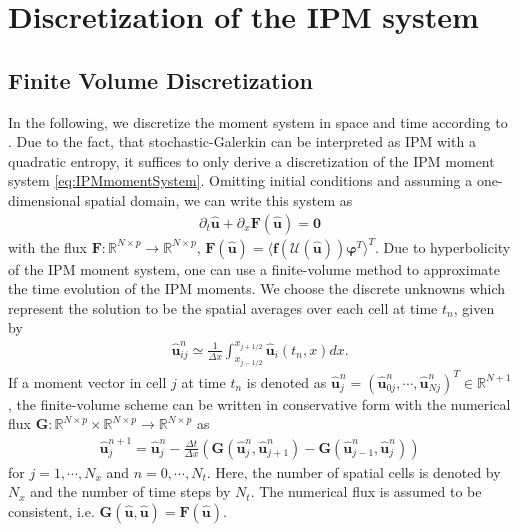 \section{Discretization of the IPM system}
\label{sec:framework}
\subsection{Finite Volume Discretization}
In the following, we discretize the moment system in space and time according to \cite{kusch2017maximum}. Due to the fact, that stochastic-Galerkin can be interpreted as IPM with a quadratic entropy, it suffices to only derive a discretization of the IPM moment system \eqref{eq:IPMmomentSystem}.  
Omitting initial conditions and assuming a one-dimensional spatial domain, we can write this system  as
\begin{align*}
\partial_t \bm{\hat u}+\partial_x \bm{F}(\bm{\hat u}) = \bm{0}
\end{align*}
with the flux $\bm{F}:\mathbb{R}^{N\times p}\to\mathbb{R}^{N\times p}$, $\bm{F}(\bm{\hat u})=\langle \bm f(\mathcal{U}(\bm{\hat u}))\bm{\varphi}^T \rangle^T$. Due to hyperbolicity of the IPM moment system, one can use a finite-volume method to approximate the time evolution of the IPM moments. We choose the discrete unknowns which represent the solution to be the spatial averages over each cell at time $t_n$, given by
\begin{align*}
\bm{\hat u}_{ij}^n \simeq \frac{1}{\Delta x}\int_{x_{j-1/ 2}}^{x_{j+1/ 2}}\bm{\hat u}_i(t_n,x) dx.
\end{align*}
If a moment vector in cell $j$ at time $t_n$ is denoted as $\bm{\hat u}_j^n = (\bm{\hat u}_{0j}^n,\cdots,\bm{\hat u}_{Nj}^n)^T\in\mathbb{R}^{N+1}$, the finite-volume scheme can be written in conservative form with the numerical flux $\bm{G}:\mathbb{R}^{N\times p}\times\mathbb{R}^{N\times p}\to\mathbb{R}^{N\times p}$ as
\begin{align}\label{eq:IPMDiscretization}
\bm{\hat u}_{j}^{n+1} = \bm{\hat u}_{j}^{n}  - \frac{\Delta t}{\Delta x}\left( \bm{G}(\bm{\hat u}_{j}^{n},\bm{\hat u}_{j+1}^{n})- \bm{G}(\bm{\hat u}_{j-1}^{n},\bm{\hat u}_{j}^{n})\right)
\end{align}
for $j = 1,\cdots,N_x$ and $n = 0,\cdots,N_t$. Here, the number of spatial cells is denoted by $N_x$ and the number of time steps by $N_t$.
The numerical flux is assumed to be consistent, i.e. $\bm{G}(\bm{\hat{u}},\bm{\hat{u}})=\bm{F}(\bm{\hat{u}})$.

